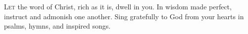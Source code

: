
\lettrine{L}{et} the word of Christ, rich as it is, dwell in you. In wisdom made perfect, instruct and admonish one another. Sing gratefully to God from your hearts in psalms, hymns, and inspired songs.
